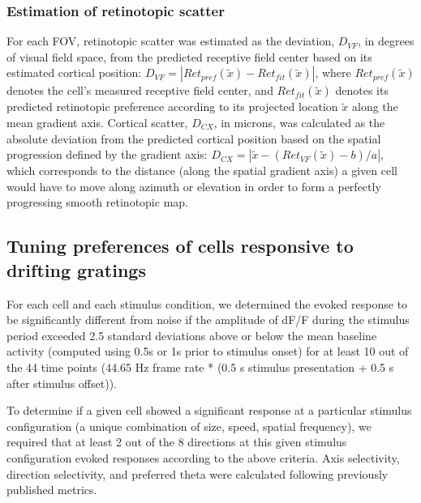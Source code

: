 \subsubsection{Estimation of retinotopic scatter}
For each FOV, retinotopic scatter was estimated as the deviation, $D_{VF}$, in degrees of visual field space, from the predicted receptive field center based on its estimated cortical position:
$D_{VF}=|Ret_{pref}(\tilde{x}) - Ret_{fit}(\tilde{x})|$, where $Ret_{pref}(\tilde{x})$ denotes the cell's measured receptive field center, and $Ret_{fit}(\tilde{x})$ denotes its predicted retinotopic preference according to its projected location $\tilde{x}$ along the mean gradient axis. Cortical scatter, $D_{CX}$, in microns, was calculated as the absolute deviation from the predicted cortical position based on the spatial progression defined by the gradient axis: $D_{CX}=|\tilde{x}-(Ret_{VF}(\tilde{x})-b)/a|$, which corresponds to the distance (along the spatial gradient axis) a given cell would have to move along azimuth or elevation in order to form a perfectly progressing smooth retinotopic map. 

\subsection{Tuning preferences of cells responsive to drifting gratings}
For each cell and each stimulus condition, we determined the evoked response to be significantly different from noise if the amplitude of dF/F during the stimulus period exceeded 2.5 standard deviations above or below the mean baseline activity (computed using 0.5s or 1s prior to stimulus onset) for at least 10 out of the 44 time points (44.65 Hz frame rate * (0.5 s stimulus presentation + 0.5 s after stimulus offset)).

To determine if a given cell showed a significant response at a particular stimulus configuration (a unique combination of size, speed, spatial frequency), we required that at least 2 out of the 8 directions at this given stimulus configuration evoked responses according to the above criteria. Axis selectivity, direction selectivity, and preferred theta were calculated following previously published metrics\cite{Liang2018}. 

